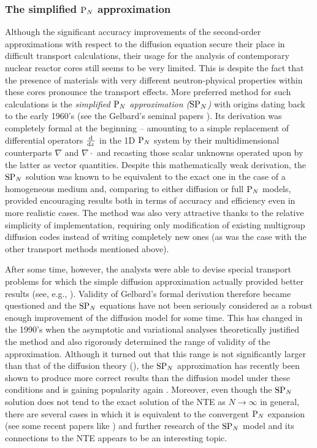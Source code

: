 \subsubsection{The simplified $\text{P}_{N}$ approximation}

Although the significant accuracy improvements of the second-order approximations with respect to the diffusion equation
secure their place in difficult transport calculations, their usage for the analysis of contemporary nuclear reactor
cores still seems to be very limited. This is despite the fact that the presence of materials with very different
neutron-physical properties within these cores%
pronounce the transport effects. More preferred method for such calculations is the \textit{simplified $\text{P}_{N}$
approximation ($\text{SP}_{N}$)} with origins dating back to the early 1960's (see the Gelbard's seminal papers
\cite{Gelbard1,Gelbard2}). Its derivation was completely formal at the beginning -- amounting to a simple replacement of
differential operators $\textstyle\frac{\text{d}^{}{}}{\text{d} {z}^{}}$ in the 1D $\text{P}_{N}$ system by their multidimensional counterparts $\nabla$ and
$\nabla\cdot$ and recasting those scalar unknowns operated upon by the latter as vector quantities. Despite this
mathematically weak derivation, the $\text{SP}_{N}$ solution was known to be equivalent to the exact one in the case of a
homogeneous medium and, comparing to either diffusion or full $\text{P}_{N}$ models, provided encouraging results both in terms
of accuracy and efficiency even in more realistic cases. The method was also very attractive thanks to the relative
simplicity of implementation, requiring only modification of existing multigroup diffusion codes instead of writing
completely new ones (as was the case with the other transport methods mentioned above).

After some time, however, the analysts were able to devise special transport problems for which the simple diffusion
approximation actually provided better results (see, e.g., \cite[p. 247]{Coppa1}). Validity of Gelbard's formal
derivation therefore became questioned and the $\text{SP}_{N}$ equations have not been seriously considered as a robust enough
improvement of the diffusion model for some time. This has changed in the 1990's when the asymptotic and variational
analyses \cite{Larsen1,Brantley1,Pomraning1} theoretically justified the method and also rigorously determined the range
of validity of the approximation. Although it turned out that this range is not significantly larger than that of the
diffusion theory (\cite{Larsen1}), the $\text{SP}_{N}$ approximation has recently been shown to produce more correct results than
the diffusion model under these conditions and is gaining popularity again
\cite{Frank1,McClarren1,Ragusa1,Larsen3,Kirschenmann1}. Moreover, even though the $\text{SP}_{N}$ solution does not tend to the
exact solution of the NTE as $N\to\infty$ in general, there are several cases in which it is equivalent to the
convergent $\text{P}_{N}$ expansion (see some recent papers like \cite{Coppa2,McClarren2,Larsen2}) and further research of the
$\text{SP}_{N}$ model and its connections to the NTE appears to be an interesting topic.

